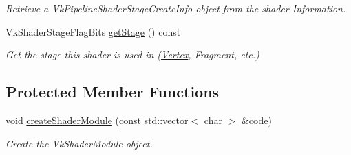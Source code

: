\begin{DoxyCompactItemize}
\begin{DoxyCompactList}\small\item\em Retrieve a Vk\+Pipeline\+Shader\+Stage\+Create\+Info object from the shader Information. \end{DoxyCompactList}\item 
\mbox{\label{class_shader_aaa484811d944aa3e484e25a540864fcd}} 
Vk\+Shader\+Stage\+Flag\+Bits \mbox{\hyperlink{class_shader_aaa484811d944aa3e484e25a540864fcd}{get\+Stage}} () const
\begin{DoxyCompactList}\small\item\em Get the stage this shader is used in (\mbox{\hyperlink{struct_vertex}{Vertex}}, Fragment, etc.) \end{DoxyCompactList}\end{DoxyCompactItemize}
\subsection*{Protected Member Functions}
\begin{DoxyCompactItemize}
\item 
void \mbox{\hyperlink{class_shader_ad2d07a27f021556943102da0479a9e08}{create\+Shader\+Module}} (const std\+::vector$<$ char $>$ \&code)
\begin{DoxyCompactList}\small\item\em Create the Vk\+Shader\+Module object. \end{DoxyCompactList}\end{DoxyCompactItemize}
